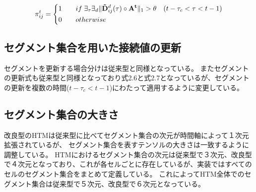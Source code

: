 \begin{equation}
  \pi^t_{ij} =
  \left\{
  \begin{alignedat}{2}
    1 \qquad &if \; \exists_\tau \exists_d\|{\bf \tilde{D}}^d_{ij}(\tau) \circ {\bf A^t}\|_1 > \theta \quad (t-\tau_c < \tau < t-1)\\
    0 \qquad &otherwise
  \end{alignedat}
  \right.
\end{equation}

\subsection{セグメント集合を用いた接続値の更新}
セグメントを更新する場合分けは従来型と同様となっている。
またセグメントの更新式も従来型と同様となっており式2.6と式2.7となっているが、セグメントの更新を複数の時間($t-\tau_c < t-1$)にわたって適用するように変更している。

\subsection{セグメント集合の大きさ}
改良型のHTMは従来型に比べてセグメント集合の次元が時間軸によって１次元拡張されているが、
セグメント集合を表すテンソルの大きさは一致するように調整している。
HTMにおけるセグメント集合の次元は従来型で３次元、改良型で４次元となっており、これが各セルごとに存在しているが、実装ではすべてのセルのセグメント集合をまとめて定義している。
これによってHTM全体でのセグメント集合は従来型で５次元、改良型で６次元となっている。
